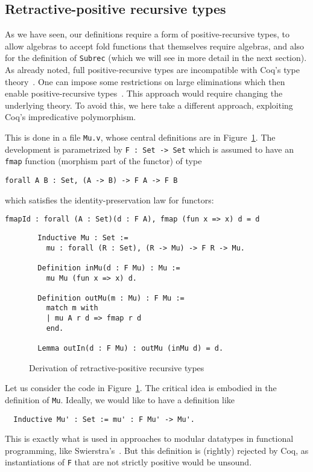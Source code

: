 \documentclass[a4paper,USenglish]{lipics-v2021}
\begin{document}
\subsection{Retractive-positive recursive types}
\label{sec:mu}

As we have seen, our definitions require a form of positive-recursive
types, to allow algebras to accept fold functions that themselves
require algebras, and also for the definition of \verb|Subrec| (which
we will see in more detail in the next section).  As already noted,
full positive-recursive types are incompatible with Coq's type
theory~\cite{coquand88}.  One can impose some restrictions on large
eliminations which then enable positive-recursive
types~\cite{blanqui05}.  This approach would require changing the
underlying theory.  To avoid this, we here take a different approach,
exploiting Coq's impredicative polymorphism.

This is done in a file \verb|Mu.v|, whose central definitions are in
Figure~\ref{fig:mu}.  The development is parametrized by
\verb|F : Set -> Set| which is assumed to have an \verb|fmap| function
(morphism part of the functor) of type
\begin{verbatim}
forall A B : Set, (A -> B) -> F A -> F B
\end{verbatim}
\noindent which satisfies the identity-preservation law for functors:
\begin{verbatim}
fmapId : forall (A : Set)(d : F A), fmap (fun x => x) d = d
\end{verbatim}

\begin{figure}
\begin{verbatim}
  Inductive Mu : Set := 
    mu : forall (R : Set), (R -> Mu) -> F R -> Mu.

  Definition inMu(d : F Mu) : Mu :=
    mu Mu (fun x => x) d.

  Definition outMu(m : Mu) : F Mu :=
    match m with
    | mu A r d => fmap r d
    end.

  Lemma outIn(d : F Mu) : outMu (inMu d) = d.
\end{verbatim}
\caption{Derivation of retractive-positive recursive types}
\label{fig:mu}
\end{figure}  

Let us consider the code in Figure~\ref{fig:mu}.  The critical
idea is embodied in the definition of \verb|Mu|.  Ideally, we would like
to have a definition like
\begin{verbatim}
  Inductive Mu' : Set := mu' : F Mu' -> Mu'.
\end{verbatim}
\noindent This is exactly what is used in approaches to modular
datatypes in functional programming, like
Swierstra's~\cite{swierstra08}.  But this definition is (rightly)
rejected by Coq, as instantiations of
\verb|F| that are not strictly positive would be unsound.
\end{document}
